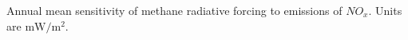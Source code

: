 Annual mean sensitivity of methane radiative forcing to emissions of $NO_x$. Units are $\mathrm{mW/m^2}$.\label{fig:drfdenox}